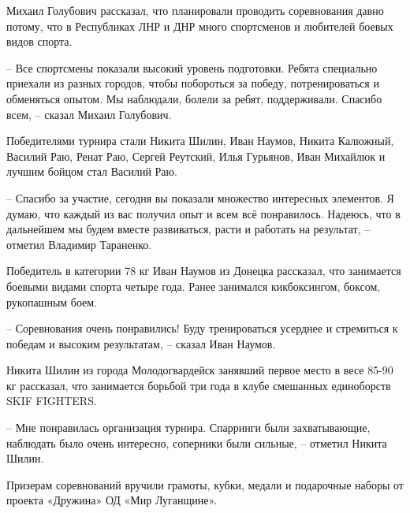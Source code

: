 Михаил Голубович рассказал, что планировали проводить соревнования давно
потому, что в Республиках ЛНР и ДНР много спортсменов и любителей боевых видов
спорта.


– Все спортсмены показали высокий уровень подготовки. Ребята специально
приехали из разных городов, чтобы побороться за победу, потренироваться и
обменяться опытом. Мы наблюдали, болели за ребят, поддерживали. Спасибо всем, –
сказал Михаил Голубович.


Победителями турнира стали Никита Шилин, Иван Наумов,  Никита Калюжный, Василий
Раю, Ренат Раю, Сергей Реутский, Илья Гурьянов, Иван Михайлюк и лучшим бойцом
стал Василий Раю.


– Спасибо за участие, сегодня вы показали множество интересных элементов. Я
думаю, что каждый из вас получил опыт и всем всё понравилось. Надеюсь, что в
дальнейшем мы будем вместе развиваться, расти и работать на результат, –
отметил Владимир Тараненко.

Победитель в категории 78 кг Иван Наумов из Донецка рассказал, что занимается
боевыми видами спорта четыре года. Ранее занимался кикбоксингом, боксом,
рукопашным боем.

– Соревнования очень понравились! Буду тренироваться усерднее и стремиться к
победам и высоким результатам, – сказал Иван Наумов.

Никита Шилин из города Молодогвардейск занявший первое место в весе 85-90 кг
рассказал, что занимается борьбой три года в клубе смешанных единоборств SKIF
FIGHTERS.

– Мне понравилась организация турнира. Спарринги были захватывающие, наблюдать
было очень интересно, соперники были сильные,  – отметил Никита Шилин.

Призерам соревнований вручили грамоты, кубки, медали и подарочные наборы от
проекта «Дружина» ОД «Мир Луганщине».
